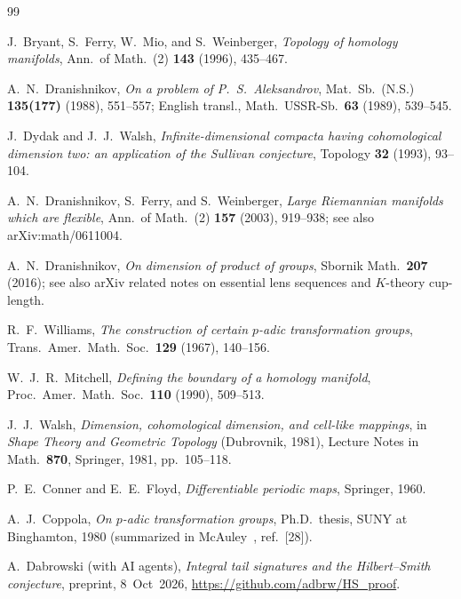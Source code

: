 \documentclass[11pt]{article}
\theoremstyle{definition}
\begin{document}
\begin{thebibliography}{99}

J.~Bryant, S.~Ferry, W.~Mio, and S.~Weinberger,
\textit{Topology of homology manifolds},
Ann.\ of Math.\ (2) \textbf{143} (1996), 435--467.

A.~N.\ Dranishnikov,
\textit{On a problem of P.~S.\ Aleksandrov},
Mat.\ Sb.\ (N.S.) \textbf{135(177)} (1988), 551--557; English transl.,
Math.\ USSR-Sb.\ \textbf{63} (1989), 539--545.

J.~Dydak and J.~J.\ Walsh,
\textit{Infinite-dimensional compacta having cohomological dimension two: an
application of the Sullivan conjecture},
Topology \textbf{32} (1993), 93--104.

A.~N.\ Dranishnikov, S.~Ferry, and S.~Weinberger,
\textit{Large Riemannian manifolds which are flexible},
Ann.\ of Math.\ (2) \textbf{157} (2003), 919--938;
see also arXiv:math/0611004.

A.~N.\ Dranishnikov,
\textit{On dimension of product of groups},
Sbornik Math.\ \textbf{207} (2016); see also arXiv related notes on
essential lens sequences and $K$-theory cup-length.

R.~F.\ Williams,
\textit{The construction of certain $p$-adic transformation groups},
Trans.\ Amer.\ Math.\ Soc.\ \textbf{129} (1967), 140--156.

W.~J.~R.\ Mitchell,
\textit{Defining the boundary of a homology manifold},
Proc.\ Amer.\ Math.\ Soc.\ \textbf{110} (1990), 509--513.

J.~J.\ Walsh,
\textit{Dimension, cohomological dimension, and cell-like mappings},
in \textit{Shape Theory and Geometric Topology} (Dubrovnik, 1981),
Lecture Notes in Math.\ \textbf{870}, Springer, 1981, pp.~105--118.

P.~E.\ Conner and E.~E.\ Floyd,
\textit{Differentiable periodic maps},
Springer, 1960.  %

A.~J.\ Coppola,
\textit{On $p$-adic transformation groups},
Ph.D.\ thesis, SUNY at Binghamton, 1980
(summarized in McAuley~\cite{mcauley2001}, ref.~[28]).

A.~Dabrowski (with AI agents),
\textit{Integral tail signatures and the Hilbert--Smith conjecture},
preprint, 8~Oct~2026,
\url{https://github.com/adbrw/HS_proof}.


\end{thebibliography}
\end{document}
